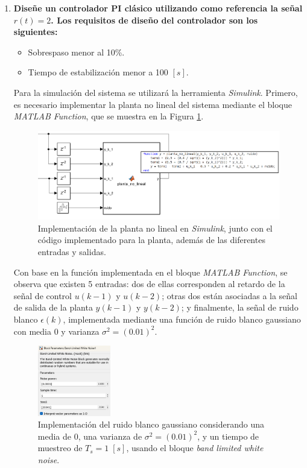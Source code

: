 \begin{enumerate}
    \item \textbf{Diseñe un controlador PI clásico utilizando como referencia la señal \(r(t) = 2\). Los requisitos de diseño del controlador son los siguientes:}
    \begin{itemize}
        \item Sobrespaso menor al 10\%.
        \item Tiempo de estabilización menor a 100 \([s]\).
    \end{itemize}
    
    Para la simulación del sistema se utilizará la herramienta \textit{Simulink}. Primero, es necesario implementar la planta no lineal del sistema mediante el bloque \textit{MATLAB Function}, que se muestra en la Figura \ref{fig:1}.
    
    \begin{figure}
        \centering
        \includegraphics[width=1\textwidth]{img/Figure_1}
        \caption{Implementación de la planta no lineal en \textit{Simulink}, junto con el código implementado para la planta, además de las diferentes entradas y salidas.}
        \label{fig:1}
    \end{figure}
    
    Con base en la función implementada en el bloque \textit{MATLAB Function}, se observa que existen 5 entradas: dos de ellas corresponden al retardo de la señal de control \(u(k-1)\) y \(u(k-2)\); otras dos están asociadas a la señal de salida de la planta \(y(k-1)\) y \(y(k-2)\); y finalmente, la señal de ruido blanco \(\epsilon(k)\), implementada mediante una función de ruido blanco gaussiano con media 0 y varianza \(\sigma^2 = (0.01)^2\).
    
    \begin{figure}
        \centering
        \includegraphics[width=0.3\textwidth]{img/Figure_2}
        \caption{Implementación del ruido blanco gaussiano considerando una media de 0, una varianza de \(\sigma^2 = (0.01)^2\), y un tiempo de muestreo de \(T_s = 1 \; [s]\), usando el bloque \textit{band limited white noise}.}
        \label{fig:2}
    \end{figure}
    

\end{enumerate}
